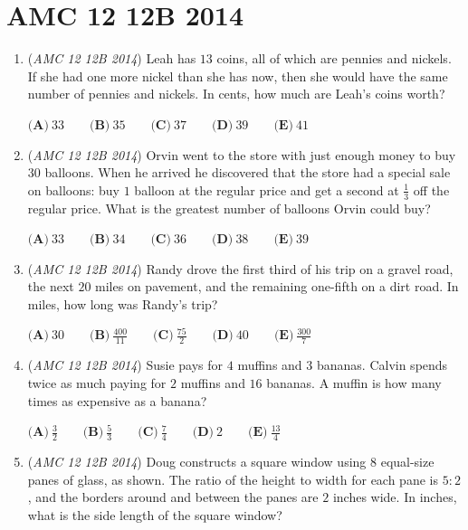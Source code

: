\section{AMC 12 12B 2014}
        \begin{enumerate}
        	\item (\textit{AMC 12 12B 2014}) Leah has $13$ coins, all of which are pennies and nickels. If she had one more nickel than she has now, then she would have the same number of pennies and nickels. In cents, how much are Leah's coins worth?


 $\textbf{(A)}\ 33\qquad\textbf{(B)}\ 35\qquad\textbf{(C)}\ 37\qquad\textbf{(D)}\ 39\qquad\textbf{(E)}\ 41$


	\item (\textit{AMC 12 12B 2014}) Orvin went to the store with just enough money to buy $30$ balloons. When he arrived he discovered that the store had a special sale on balloons: buy $1$ balloon at the regular price and get a second at $\frac{1}{3}$ off the regular price. What is the greatest number of balloons Orvin could buy?


 $\textbf{(A)}\ 33\qquad\textbf{(B)}\ 34\qquad\textbf{(C)}\ 36\qquad\textbf{(D)}\ 38\qquad\textbf{(E)}\ 39$


	\item (\textit{AMC 12 12B 2014}) Randy drove the first third of his trip on a gravel road, the next $20$ miles on pavement, and the remaining one-fifth on a dirt road. In miles, how long was Randy's trip?


 $\textbf{(A)}\ 30\qquad\textbf{(B)}\ \frac{400}{11}\qquad\textbf{(C)}\ \frac{75}{2}\qquad\textbf{(D)}\ 40\qquad\textbf{(E)}\ \frac{300}{7}$


	\item (\textit{AMC 12 12B 2014}) Susie pays for $4$ muffins and $3$ bananas. Calvin spends twice as much paying for $2$ muffins and $16$ bananas. A muffin is how many times as expensive as a banana?


 $\textbf{(A)}\ \frac{3}{2}\qquad\textbf{(B)}\ \frac{5}{3}\qquad\textbf{(C)}\ \frac{7}{4}\qquad\textbf{(D)}\ 2\qquad\textbf{(E)}\ \frac{13}{4}$


	\item (\textit{AMC 12 12B 2014}) Doug constructs a square window using $8$ equal-size panes of glass, as shown. The ratio of the height to width for each pane is $5 : 2$, and the borders around and between the panes are $2$ inches wide. In inches, what is the side length of the square window?


\end{enumerate}
